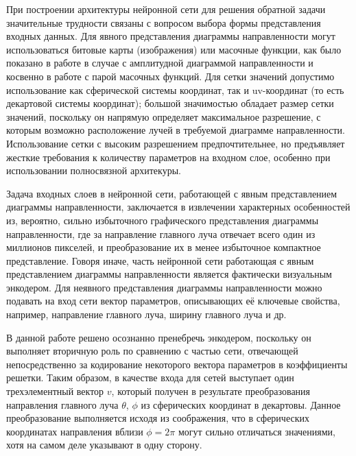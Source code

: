 \documentclass[nonacm, sigconf]{acmart}
\begin{document}
При построении архитектуры нейронной сети для решения обратной задачи значительные трудности связаны с вопросом выбора формы представления входных данных. Для явного представления диаграммы направленности могут использоваться битовые карты (изображения) или масочные функции, как было показано в работе \cite{conv} в случае с амплитудной диаграммой направленности и косвенно в работе \cite{mlp1} с парой масочных функций. Для сетки значений допустимо использование как сферической системы координат, так и uv-координат (то есть декартовой системы координат); большой значимостью обладает размер сетки значений, поскольку он напрямую определяет максимальное разрешение, с которым возможно расположение лучей в требуемой диаграмме направленности. Использование сетки с высоким разрешением предпочтительнее, но предъявляет жесткие требования к количеству параметров на входном слое, особенно при использовании полносвязной архитекуры.

Задача входных слоев в нейронной сети, работающей с явным представлением диаграммы направленности, заключается в извлечении характерных особенностей из, вероятно, сильно избыточного графического представления диаграммы направленности, где за направление главного луча отвечает всего один из миллионов пикселей, и преобразование их в менее избыточное компактное представление. Говоря иначе, часть нейронной сети работающая с явным представлением диаграммы направленности является фактически визуальным энкодером. Для неявного представления диаграммы направленности можно подавать на вход сети вектор параметров, описывающих её ключевые свойства, например, направление главного луча, ширину главного луча и др.

В данной работе решено осознанно пренебречь энкодером, поскольку он выполняет вторичную роль по сравнению с частью сети, отвечающей непосредственно за кодирование некоторого вектора параметров в коэффициенты решетки. Таким образом, в качестве входа для сетей выступает один трехэлементный вектор $v$, который получен в результате преобразования направления главного луча $\theta$, $\phi$ из сферических координат в декартовы. Данное преобразование выполняется исходя из соображения, что в сферических координатах направления вблизи $\phi=2 \pi$ могут сильно отличаться значениями, хотя на самом деле указывают в одну сторону.
\end{document}
